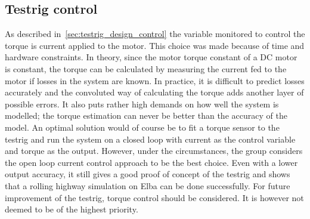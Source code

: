 \subsection{Testrig control}\label{sec:discussion_testrig_control}
As described in~\ref{sec:testrig_design_control} the variable monitored to control the torque is current applied to the motor. This choice was made because of time
and hardware constraints. In theory, since the motor torque constant of a DC motor is
constant, the torque can be calculated by measuring the current fed to the
motor if losses in the system are known. In practice, it is difficult to
predict losses accurately and the convoluted way of calculating the torque adds
another layer of possible errors. It also puts rather high demands on how well
the system is modelled; the torque estimation can never be better than the
accuracy of the model. An optimal solution would of course be to fit a torque
sensor to the testrig and run the system on a closed loop with current as the
control variable and torque as the output. However, under the
circumstances, the group considers the open loop current control approach to be
the best choice. Even with a lower output accuracy, it still gives a
good proof of concept of the testrig and shows that a rolling highway simulation
on Elba can be done successfully.
For future improvement of the testrig, torque control should be considered. It is however not deemed to be of the highest priority. %


